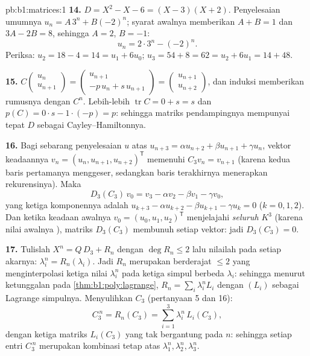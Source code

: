 \begin{solution}{pb:b1:matrices:1}
\textbf{14.} $D = X^2 - X - 6 = (X - 3)(X + 2)$. Penyelesaian
umumnya $u_n = A\,3^n + B(-2)^n$; syarat awalnya memberikan
$A + B = 1$ dan $3A - 2B = 8$, sehingga $A = 2$, $B = -1$:
\[
u_n = 2\cdot 3^n - (-2)^n .
\]
Periksa: $u_2 = 18 - 4 = 14 = u_1 + 6u_0$; $u_3 = 54 + 8 = 62 =
u_2 + 6u_1 = 14 + 48$.

\textbf{15.} $C\begin{pmatrix} u_n\\ u_{n+1}\end{pmatrix} =
\begin{pmatrix} u_{n+1}\\ -p\,u_n + s\,u_{n+1}\end{pmatrix} =
\begin{pmatrix} u_{n+1}\\ u_{n+2}\end{pmatrix}$, dan induksi
memberikan rumusnya dengan $C^n$. Lebih-lebih $\operatorname{tr} C = 0
+ s = s$ dan $p(C) = 0\cdot s - 1\cdot(-p) = p$: sehingga matriks
pendampingnya mempunyai tepat $D$ sebagai  Cayley--Hamiltonnya.

\textbf{16.} Bagi sebarang penyelesaian $u$ atas $u_{n+3} = \alpha u_{n+2} +
\beta u_{n+1} + \gamma u_n$, vektor keadaannya $v_n = (u_n,
u_{n+1}, u_{n+2})^{\mathsf T}$ memenuhi $C_3 v_n = v_{n+1}$
(karena kedua baris pertamanya menggeser, sedangkan baris terakhirnya menerapkan
rekurensinya). Maka
\[
D_3(C_3)\,v_0 = v_3 - \alpha v_2 - \beta v_1 - \gamma v_0 ,
\]
yang ketiga komponennya adalah $u_{k+3} - \alpha u_{k+2} - \beta
u_{k+1} - \gamma u_k = 0$ ($k = 0, 1, 2$). Dan ketika keadaan awalnya
$v_0 = (u_0, u_1, u_2)^{\mathsf T}$ menjelajahi \emph{seluruh}
$K^3$ (karena nilai awalnya ), matriks $D_3(C_3)$ membunuh
setiap vektor: jadi $D_3(C_3) = 0$.

\textbf{17.} Tulislah $X^n = Q\,D_3 + R_n$ dengan $\deg R_n \leq 2$
lalu nilailah pada setiap akarnya: $\lambda_i^n = R_n(\lambda_i)$. Jadi
$R_n$ merupakan  berderajat $\leq 2$ yang menginterpolasi ketiga
nilai $\lambda_i^n$ pada ketiga simpul berbeda $\lambda_i$: sehingga menurut
ketunggalan pada \cref{thm:b1:poly:lagrange}, $R_n = \sum_i
\lambda_i^n L_i$ dengan $(L_i)$ sebagai  Lagrange simpulnya.
Menyulihkan $C_3$ (pertanyaan 5 dan 16):
\[
C_3^{\,n} = R_n(C_3) = \sum_{i=1}^{3} \lambda_i^n\,L_i(C_3),
\]
dengan ketiga matriks $L_i(C_3)$ yang tak bergantung pada $n$: sehingga setiap
entri $C_3^{\,n}$ merupakan kombinasi tetap atas $\lambda_1^n,
\lambda_2^n, \lambda_3^n$.


\end{solution}
